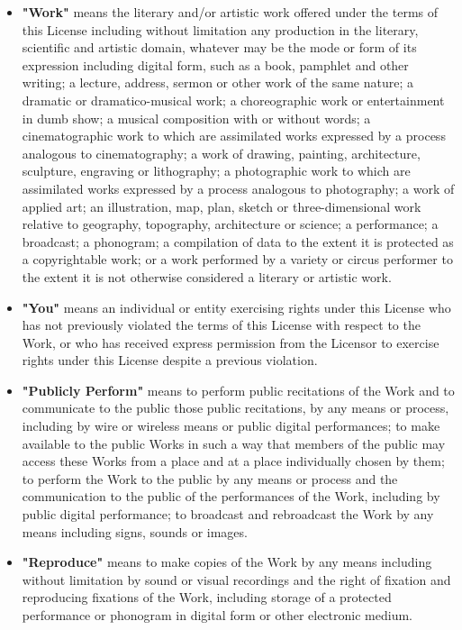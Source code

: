 \begin{itemize}
\begin {itemize}
    \item {\textbf{"Work"} means the literary and/or artistic work offered under
    the terms of this License including without limitation any production in the
    literary, scientific and artistic domain, whatever may be the mode or form
    of its expression including digital form, such as a book, pamphlet and other
    writing; a lecture, address, sermon or other work of the same nature; a
    dramatic or dramatico-musical work; a choreographic work or entertainment in
    dumb show; a musical composition with or without words; a cinematographic
    work to which are assimilated works expressed by a process analogous to
    cinematography; a work of drawing, painting, architecture, sculpture,
    engraving or lithography; a photographic work to which are assimilated works
    expressed by a process analogous to photography; a work of applied art; an
    illustration, map, plan, sketch or three-dimensional work relative to
    geography, topography, architecture or science; a performance; a broadcast;
    a phonogram; a compilation of data to the extent it is protected as a
    copyrightable work; or a work performed by a variety or circus performer to
    the extent it is not otherwise considered a literary or artistic work.}

    \item {\textbf{"You"} means an individual or entity exercising rights under
    this License who has not previously violated the terms of this License with
    respect to the Work, or who has received express permission from the
    Licensor to exercise rights under this License despite a previous
    violation.}

    \item {\textbf{"Publicly Perform"} means to perform public recitations of
    the Work and to communicate to the public those public recitations, by any
    means or process, including by wire or wireless means or public digital
    performances; to make available to the public Works in such a way that
    members of the public may access these Works from a place and at a place
    individually chosen by them; to perform the Work to the public by any means
    or process and the communication to the public of the performances of the
    Work, including by public digital performance; to broadcast and rebroadcast
    the Work by any means including signs, sounds or images.}

    \item {\textbf{"Reproduce"} means to make copies of the Work by any means
    including without limitation by sound or visual recordings and the right of
    fixation and reproducing fixations of the Work, including storage of a
    protected performance or phonogram in digital form or other electronic
    medium.}
  \end {itemize} 


\end{itemize}

